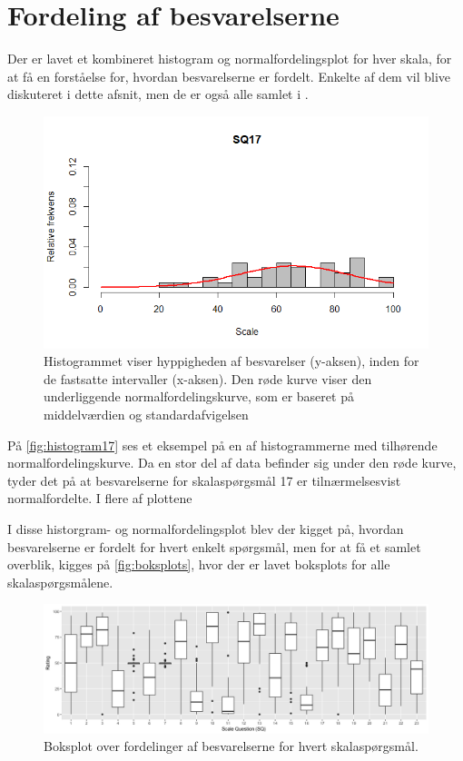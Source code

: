 \section{Fordeling af besvarelserne}
\label{TestAfSkalaFordeling}
%
Der er lavet et kombineret histogram og normalfordelingsplot for hver skala, for at få en forståelse for, hvordan besvarelserne er fordelt. Enkelte af dem vil blive diskuteret i dette afsnit, men de er også alle samlet i .

\begin{figure}[H]
\centering
\includegraphics[width = \textwidth]{Figure/DatabehandlingSkalaer/HistogramNormalFordeling/SQ17} 
\caption{Histogrammet viser hyppigheden af besvarelser (y-aksen), inden for de fastsatte intervaller (x-aksen). Den røde kurve viser den underliggende normalfordelingskurve, som er baseret på middelværdien og standardafvigelsen}
\label{fig:histogram17}
\end{figure}
\noindent
%
På \autoref{fig:histogram17} ses et eksempel på en af histogrammerne med tilhørende normalfordelingskurve. Da en stor del af data befinder sig under den røde kurve, tyder det på at besvarelserne for skalaspørgsmål 17 er tilnærmelsesvist normalfordelte.\blankline
%
I flere af plottene 

\blankline
%
I disse historgram- og normalfordelingsplot blev der kigget på, hvordan besvarelserne er fordelt for hvert enkelt spørgsmål, men for at få et samlet overblik, kigges på \autoref{fig:boksplots}, hvor der er lavet boksplots for alle skalaspørgsmålene. 

\begin{figure}[H]
\centering
\includegraphics[width = \textwidth]{Figure/DatabehandlingSkalaer/boksplot0er} 
\caption{Boksplot over fordelinger af besvarelserne for hvert skalaspørgsmål.}
\label{fig:boksplots}
\end{figure}
\noindent
%

